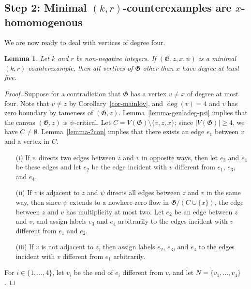 \documentclass{article}
\newcommand\g{\mathfrak{G}}
\newtheorem{lemma}[theorem]{Lemma}
\begin{document}
\subsection{Step 2: Minimal $(k,r)$-counterexamples are $x$-\\homomogenous}\label{subsec:xhomogeasel}
We are now ready to deal with vertices of degree four.

\begin{lemma}\label{lemma-genladeg-no4}
Let $k$ and $r$ be non-negative integers.  If $(\g,z,x,\psi)$ is a minimal $(k,r)$-counter\-exam\-ple,
then all vertices of $\g$ other than $x$ have degree at least five.
\end{lemma}
\begin{proof}
Suppose for a contradiction that $\g$ has a vertex $v\neq x$ of degree at most four.  Note that $v\neq z$ by Corollary~\ref{cor-mainlov},
and $\deg(v)=4$ and $v$ has zero boundary by tameness of $(\g,z)$.
Lemma~\ref{lemma-genladeg-psi} implies that the canvas $(\g,z)$ is $\psi$-critical.  Let $C=V(\g)\setminus\{v,z,x\}$; since $|V(\g)|\ge 4$, we have $C\neq\emptyset$.
Lemma~\ref{lemma-2con} implies that there exists an edge $e_1$ between $v$ and a vertex in $C$.
\begin{itemize}
\item[(i)] If $\psi$ directs two edges between $z$ and $v$ in opposite ways, then let $e_3$ and $e_4$ be these edges and let $e_2$
be the edge incident with $v$ different from $e_1$, $e_3$, and $e_4$.
\item[(ii)] If $v$ is adjacent to $z$ and $\psi$ directs all edges between $z$ and $v$ in the same way, then 
since $\psi$ extends to a nowhere-zero flow in $\g/(C\cup \{x\})$, the edge between $z$ and $v$ has multiplicity at most two.
Let $e_2$ be an edge between $z$ and $v$, and assign labels $e_3$ and $e_4$ arbitrarily to the edges incident with $v$ different from $e_1$ and $e_2$.
\item[(iii)] If $v$ is not adjacent to $z$, then assign labels $e_2$, $e_3$, and $e_4$ to the edges incident with $v$ different from $e_1$ arbitrarily.
\end{itemize}
For $i\in\{1,\ldots,4\}$, let $v_i$ be the end of $e_i$ different from $v$, and let $N=\{v_1,\ldots, v_4\}$.


\end{proof}
\end{document}
